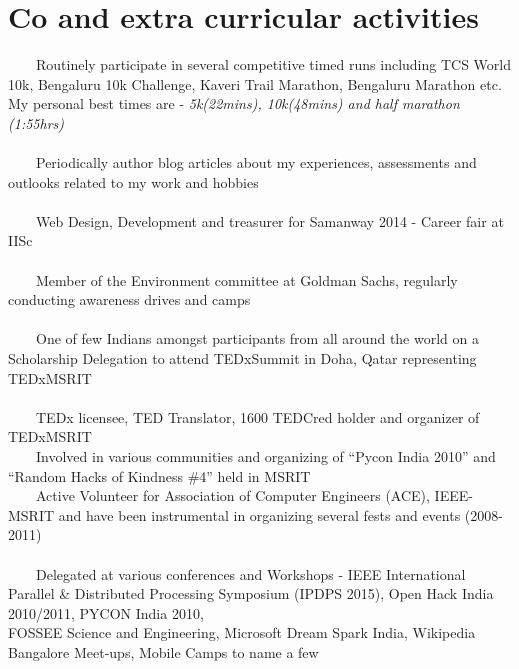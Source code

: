 \documentclass[a4paper,10pt]{article} %
\newcommand{\tabitem}{~~\llap{\textbullet}~~}
\begin{document}

\section{Co and extra curricular activities}
\tabitem Routinely participate in several competitive timed runs including TCS World 10k, Bengaluru 10k Challenge, Kaveri Trail Marathon, Bengaluru Marathon etc. \\ My personal best times are - \textit{5k(22mins), \space 10k(48mins) and half marathon (1:55hrs)} \\
\\
\tabitem Periodically author blog articles about my experiences, assessments and outlooks related to my work and hobbies \\
\\
\tabitem Web Design, Development and treasurer for Samanway 2014 - Career fair at IISc \\
\\ 
\tabitem Member of the Environment committee at Goldman Sachs, regularly conducting awareness drives and camps \\
\\
\tabitem One of few Indians amongst participants from all around the world on a Scholarship Delegation to attend TEDxSummit in Doha, Qatar representing TEDxMSRIT \\
\\
\tabitem TEDx licensee, TED Translator, 1600 TEDCred holder and organizer of TEDxMSRIT \\
\tabitem Involved in various communities and organizing of “Pycon India 2010” and “Random Hacks of Kindness \#4” held in MSRIT\\
\tabitem Active Volunteer for Association of Computer Engineers (ACE), IEEE-MSRIT and have been instrumental in organizing several fests and events (2008-2011)\\
\\
\tabitem Delegated at various conferences and Workshops - IEEE International Parallel \& Distributed Processing Symposium (IPDPS 2015), Open Hack India 2010/2011, PYCON India 2010,\\ FOSSEE Science and Engineering, Microsoft Dream Spark India, Wikipedia Bangalore Meet-ups, Mobile Camps to name a few\\
\\
\end{document}
